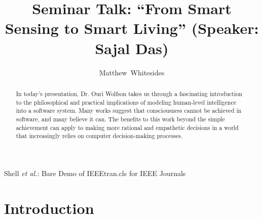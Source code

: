 \documentclass[journal,onecolumn]{IEEEtran}
\begin{document}
%
\title{Seminar Talk: ``From Smart Sensing to Smart Living'' (Speaker: Sajal Das)}

%
%
%
\author{Matthew~Whitesides}%

%
{Shell \MakeLowercase{\textit{et al.}}: Bare Demo of IEEEtran.cls for IEEE Journals}

\maketitle

\begin{abstract}
  In today's presentation, Dr. Ouri Wolfson takes us through a fascinating introduction to the philosophical and practical implications of modeling human-level intelligence into a software system. Many works suggest that consciousness cannot be achieved in software, and many believe it can. The benefits to this work beyond the simple achievement can apply to making more rational and empathetic decisions in a world that increasingly relies on computer decision-making processes. 
\end{abstract}


\IEEEpeerreviewmaketitle

\section{Introduction}
\end{document}
